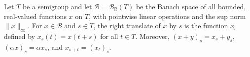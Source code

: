 Let $T$ be a semigroup and let $\mathcal{B} = \mathcal{B}_{\mathbb{R}}(T)$ be the Banach space of all bounded, real-valued functions $x$ on $T$, with pointwise linear operations and the sup norm $\|x\|_\infty$. For $x \in \mathcal{B}$ and $s \in T$, the right translate of $x$ by $s$ is the function $x_s$ defined by $x_s(t) = x(t + s)$ for all $t \in T$. Moreover, $(x + y)_s = x_s + y_s$, $(\alpha x)_s = \alpha x_s$, and $x_{s+t} = (x_t)_s$.